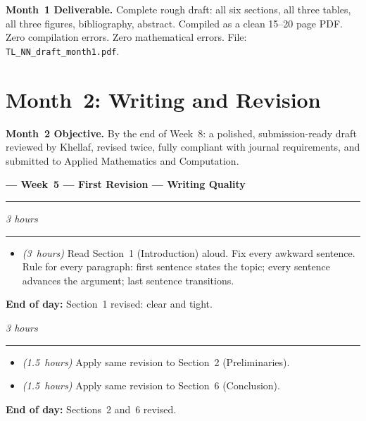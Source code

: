 \documentclass[12pt,a4paper]{article}
\newcommand{\hrs}[1]{\textit{\color{darkgray}(#1~hours)}}
\newcommand{\weekheading}[2]{%
  \vspace{0.8em}
  \noindent
  {\large\bfseries\color{midblue}--- Week~#1 ---
  \hfill\normalsize\normalfont\color{darkgray}#2}
  \vspace{0.2em}
  \\{\color{midblue}\rule{\linewidth}{0.6pt}}
  \vspace{0.3em}
}
\newcommand{\dayheading}[2]{%
  \vspace{0.3em}
  \noindent{\bfseries\color{darkblue}Day~#1}%
  \hfill{\small\color{darkgray}\textit{#2}}%
  \\[-0.4em]{\color{midgray}\rule{\linewidth}{0.4pt}}%
  \vspace{0.1em}
}
\begin{document}
\begin{tcolorbox}[deliverablestyle]
\noindent\textbf{\color{darkgreen}Month~1 Deliverable.}
Complete rough draft: all six sections, all three tables,
all three figures, bibliography, abstract. Compiled as a
clean 15--20 page PDF. Zero compilation errors. Zero
mathematical errors. File: \texttt{TL\_NN\_draft\_month1.pdf}.
\end{tcolorbox}

\newpage
\section{Month~2: Writing and Revision}

\begin{tcolorbox}[infostyle]
\noindent\textbf{Month~2 Objective.}
By the end of Week~8: a polished, submission-ready draft
reviewed by Khellaf, revised twice, fully compliant with
journal requirements, and submitted to Applied Mathematics
and Computation.
\end{tcolorbox}

\weekheading{5}{First Revision --- Writing Quality}

\begin{tcolorbox}[daystyle]
\dayheading{29}{3 hours}
\begin{itemize}[leftmargin=1.8em,itemsep=3pt]
  \item[\color{midblue}$\bullet$]
    \hrs{3} Read Section~1 (Introduction) aloud. Fix
    every awkward sentence. Rule for every paragraph:
    first sentence states the topic; every sentence
    advances the argument; last sentence transitions.
\end{itemize}
\noindent\textbf{End of day:}
Section~1 revised: clear and tight.
\end{tcolorbox}

\begin{tcolorbox}[daystyle]
\dayheading{30}{3 hours}
\begin{itemize}[leftmargin=1.8em,itemsep=3pt]
  \item[\color{midblue}$\bullet$]
    \hrs{1.5} Apply same revision to Section~2
    (Preliminaries).
  \item[\color{midblue}$\bullet$]
    \hrs{1.5} Apply same revision to Section~6
    (Conclusion).
\end{itemize}
\noindent\textbf{End of day:} Sections~2 and~6 revised.
\end{tcolorbox}
\end{document}
